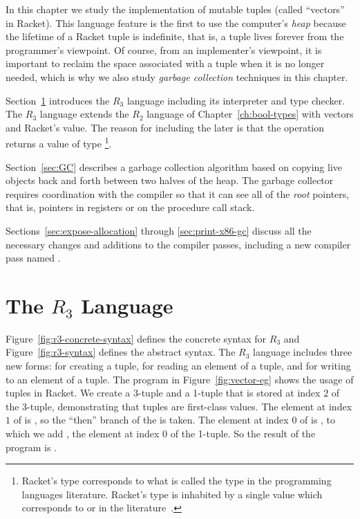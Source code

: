 \documentclass[11pt]{book}
\begin{document}
In this chapter we study the implementation of mutable tuples (called
``vectors'' in Racket). This language feature is the first to use the
computer's \emph{heap} because the lifetime of a Racket tuple is
indefinite, that is, a tuple lives forever from the programmer's
viewpoint. Of course, from an implementer's viewpoint, it is important
to reclaim the space associated with a tuple when it is no longer
needed, which is why we also study \emph{garbage collection}
techniques in this chapter.

Section~\ref{sec:r3} introduces the $R_3$ language including its
interpreter and type checker. The $R_3$ language extends the $R_2$
language of Chapter~\ref{ch:bool-types} with vectors and Racket's
 value. The reason for including the later is that the
 operation returns a value of type
\footnote{Racket's  type corresponds to what is
  called the  type in the programming languages
  literature. Racket's  type is inhabited by a single value
   which corresponds to  or \code{()} in the
  literature~\citep{Pierce:2002hj}.}.

Section~\ref{sec:GC} describes a garbage collection algorithm based on
copying live objects back and forth between two halves of the
heap. The garbage collector requires coordination with the compiler so
that it can see all of the \emph{root} pointers, that is, pointers in
registers or on the procedure call stack.

Sections~\ref{sec:expose-allocation} through \ref{sec:print-x86-gc}
discuss all the necessary changes and additions to the compiler
passes, including a new compiler pass named .

\section{The $R_3$ Language}
\label{sec:r3}

Figure~\ref{fig:r3-concrete-syntax} defines the concrete syntax for
$R_3$ and Figure~\ref{fig:r3-syntax} defines the abstract syntax.  The
$R_3$ language includes three new forms:  for creating a
tuple,  for reading an element of a tuple, and
 for writing to an element of a tuple. The program
in Figure~\ref{fig:vector-eg} shows the usage of tuples in Racket. We
create a 3-tuple  and a 1-tuple that is stored at index $2$ of
the 3-tuple, demonstrating that tuples are first-class values.  The
element at index $1$ of  is , so the ``then'' branch
of the  is taken.  The element at index $0$ of  is
, to which we add , the element at index $0$ of the
1-tuple. So the result of the program is .
\end{document}
